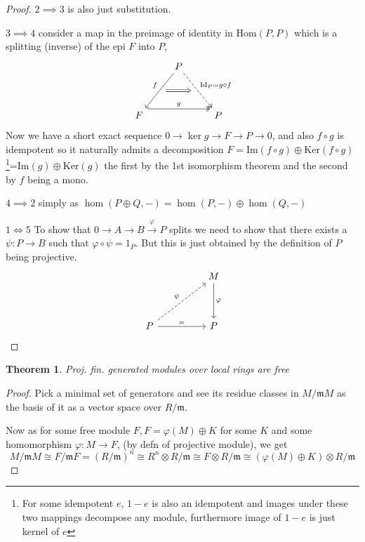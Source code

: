 \documentclass[12pt]{article}
\numberwithin{equation}{section}
\newcommand{\Hom}{{\mathrm{Hom}}}
\newcommand{\image}{{\mathrm{Im}}}
\newcommand{\kernel}{{\mathrm{Ker}}}
\newcounter{dummy} \numberwithin{dummy}{section}
\newtheorem{theorem}[dummy]{Theorem}
\begin{document}
\begin{appendices}
\begin{proof}
		$2 \implies 3$ is also just substitution.
		
		$3 \implies 4$ consider a map in the preimage of identity in $\Hom(P,P)$ which is a splitting (inverse) of the epi $F$ into $P$,
		\[\begin{tikzcd}
			& P \\
			\\
			F && P
			\arrow["g", shift left=3, two heads, from=3-1, to=3-3]
			\arrow[""{name=0, anchor=center, inner sep=0}, "f"', from=1-2, to=3-1]
			\arrow[""{name=1, anchor=center, inner sep=0}, "{\mathrm{Id}_P=g \circ f}", dashed, two heads, from=1-2, to=3-3]
			\arrow[shorten <=6pt, shorten >=6pt, Rightarrow, from=0, to=1]
		\end{tikzcd}\]
		Now we have a short exact sequence $0 \to \ker g \to F \to P \to 0$, and also $f\circ g $ is idempotent so it naturally admits a decomposition $F = \image(f \circ g) \oplus \kernel (f \circ g)$\footnote{For some idempotent $e$, $1-e$ is also an idempotent and images under these two mappings decompose any module, furthermore image of $1-e$ is just kernel of $e$}=$\image (g) \oplus \kernel (g)$ the first by the 1st isomorphism theorem and the second by $f $ being a mono.
		
		$4 \implies 2$ simply as $\hom (P \oplus Q,-) = \hom(P,-) \oplus \hom(Q,-)$
		
		$1 \iff 5$ To show that $0\to A \to B \xrightarrow{\varphi} P$ splits we need to show that there exists a $\psi: P \to B$ such that $\varphi \circ \psi = 1_P$. But this is just obtained by the definition of $P$ being projective.
		\[\begin{tikzcd}
			&& M \\
			\\
			P && P
			\arrow["\varphi", from=1-3, to=3-3]
			\arrow["\psi", dashed, from=3-1, to=1-3]
			\arrow["{=}", from=3-1, to=3-3]
		\end{tikzcd}\]
		
	\end{proof}
	
	\begin{theorem}\label{a2}Proj. fin. generated modules over local rings are free
	\end{theorem}
	\begin{proof}
		Pick a minimal set of generators and see its residue classes in $M/\mathfrak{m}M$ as the basis of it as a vector space over $R/\mathfrak{m}$.
		
		Now as for some free module $F, F=\varphi(M)\oplus K$ for some $K$ and some homomorphism $\varphi: M \to F$, (by defn of projective module), 	we get \[ M/\mathfrak{m}M \cong 	F/\mathfrak{m}F = (R/\mathfrak{m})^n\cong R^n\otimes R/\mathfrak{m} \cong F \otimes R/\mathfrak{m} \cong (\varphi(M)\oplus K) \otimes R/\mathfrak{m}\]
		

\end{proof}
\end{appendices}
\end{document}
